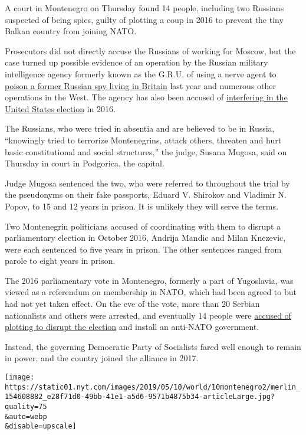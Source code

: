 A court in Montenegro on Thursday found 14 people, including two
Russians suspected of being spies, guilty of plotting a coup in 2016 to
prevent the tiny Balkan country from joining NATO.

Prosecutors did not directly accuse the Russians of working for Moscow,
but the case turned up possible evidence of an operation by the Russian
military intelligence agency formerly known as the G.R.U. of using a
nerve agent to
\href{https://www.nytimes.com/2018/09/09/world/europe/sergei-skripal-russian-spy-poisoning.html}{poison
a former Russian spy living in Britain} last year and numerous other
operations in the West. The agency has also been accused of
\href{https://www.nytimes.com/interactive/2018/07/13/us/politics/how-russia-hacked-the-2016-presidential-election.html?action=click\&module=RelatedCoverage\&pgtype=Article\&region=Footer}{interfering
in the United States election} in 2016.

The Russians, who were tried in absentia and are believed to be in
Russia, ``knowingly tried to terrorize Montenegrins, attack others,
threaten and hurt basic constitutional and social structures,'' the
judge, Susana Mugosa, said on Thursday in court in Podgorica, the
capital.

Judge Mugosa sentenced the two, who were referred to throughout the
trial by the pseudonyms on their fake passports, Eduard V. Shirokov and
Vladimir N. Popov, to 15 and 12 years in prison. It is unlikely they
will serve the terms.

Two Montenegrin politicians accused of coordinating with them to disrupt
a parliamentary election in October 2016, Andrija Mandic and Milan
Knezevic, were each sentenced to five years in prison. The other
sentences ranged from parole to eight years in prison.

The 2016 parliamentary vote in Montenegro, formerly a part of
Yugoslavia, was viewed as a referendum on membership in NATO, which had
been agreed to but had not yet taken effect. On the eve of the vote,
more than 20 Serbian nationalists and others were arrested, and
eventually 14 people were
\href{https://www.nytimes.com/2016/11/26/world/europe/finger-pointed-at-russians-in-alleged-coup-plot-in-montenegro.html}{accused
of plotting to disrupt the election} and install an anti-NATO
government.

Instead, the governing Democratic Party of Socialists fared well enough
to remain in power, and the country joined the alliance in 2017.

\texttt{[image: https://static01.nyt.com/images/2019/05/10/world/10montenegro2/merlin\_154608882\_e28f71d0-49bb-41e1-a5d6-9571b4875b34-articleLarge.jpg?quality=75\\\&auto=webp\\\&disable=upscale]}

